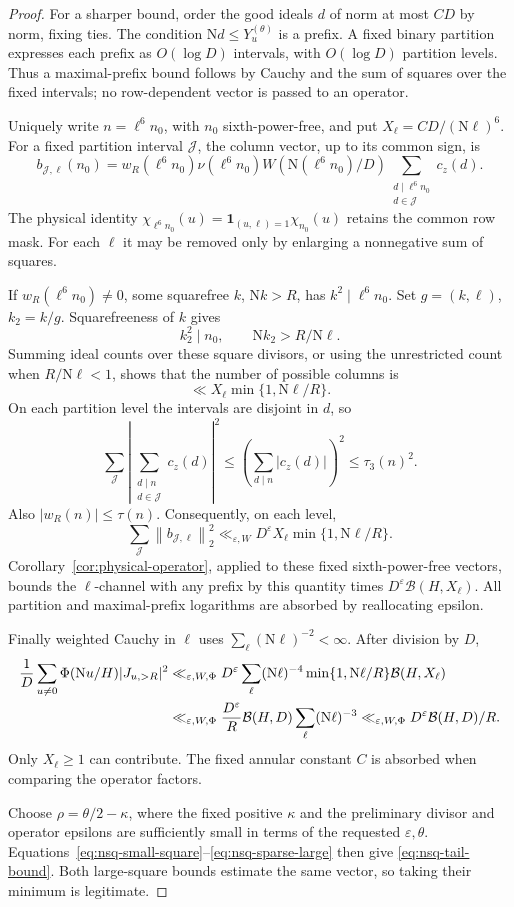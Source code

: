 \documentclass[11pt]{article}
\numberwithin{equation}{section}
\theoremstyle{definition}
\theoremstyle{remark}
\newcommand{\N}{\mathrm N}
\newcommand{\ind}{\mathbf 1}
\newcommand{\eps}{\varepsilon}
\newcommand{\norm}[1]{\left\lVert #1\right\rVert}
\begin{document}
\begin{proof}
For a sharper bound, order the good ideals \(d\) of norm at most \(CD\)
by norm, fixing ties. The condition \(\N d\le Y_u^{(\theta)}\) is a
prefix. A fixed binary partition expresses each prefix as
\(O(\log D)\) intervals, with \(O(\log D)\) partition levels.
Thus a maximal-prefix bound follows by Cauchy and the sum of squares
over the fixed intervals; no row-dependent vector is passed to an
operator.

Uniquely write \(n=\ell^6n_0\), with \(n_0\) sixth-power-free, and put
\(X_\ell=CD/(\N\ell)^6\). For a fixed partition interval \(\mathcal J\),
the column vector, up to its common sign, is
\[
 b_{\mathcal J,\ell}(n_0)=
 w_R(\ell^6n_0)\nu(\ell^6n_0)W(\N(\ell^6n_0)/D)
       \sum_{\substack{d\mid\ell^6n_0\\d\in\mathcal J}}c_z(d).
\]
The physical identity
\(\chi_{\ell^6n_0}(u)=\ind_{(u,\ell)=1}\chi_{n_0}(u)\)
retains the common row mask. For each \(\ell\) it may be removed only
by enlarging a nonnegative sum of squares.

If \(w_R(\ell^6n_0)\ne0\), some squarefree \(k\), \(\N k>R\),
has \(k^2\mid\ell^6n_0\). Set \(g=(k,\ell)\), \(k_2=k/g\).
Squarefreeness of \(k\) gives
\[
 k_2^2\mid n_0,\qquad \N k_2>R/\N\ell.
\]
Summing ideal counts over these square divisors, or using the
unrestricted count when \(R/\N\ell<1\), shows that the number of
possible columns is
\[
 \ll X_\ell\min\{1,\N\ell/R\}.
\]
On each partition level the intervals are disjoint in \(d\), so
\[
 \sum_{\mathcal J}
 \left|\sum_{\substack{d\mid n\\d\in\mathcal J}}c_z(d)\right|^2
 \le\left(\sum_{d\mid n}|c_z(d)|\right)^2\le\tau_3(n)^2.
\]
Also \(|w_R(n)|\le\tau(n)\). Consequently, on each level,
\[
 \sum_{\mathcal J}\norm{b_{\mathcal J,\ell}}_2^2
 \ll_{\eps,W}D^\eps X_\ell\min\{1,\N\ell/R\}.
\]
Corollary~\ref{cor:physical-operator}, applied to these fixed
sixth-power-free vectors, bounds the \(\ell\)-channel with any prefix
by this quantity times \(D^\eps\mathcal B(H,X_\ell)\).
All partition and maximal-prefix logarithms are absorbed by
reallocating epsilon.

Finally weighted Cauchy in \(\ell\) uses
\(\sum_\ell(\N\ell)^{-2}<\infty\). After division by \(D\),
\begin{align}
 \frac1D\sum_{u\ne0}\Phi(\N u/H)|J_{u,>R}|^2
 &\ll_{\eps,W,\Phi}D^\eps
   \sum_\ell(\N\ell)^{-4}\min\{1,\N\ell/R\}
                       \mathcal B(H,X_\ell)\notag\\
 &\ll_{\eps,W,\Phi}\frac{D^\eps}{R}\mathcal B(H,D)
                         \sum_\ell(\N\ell)^{-3}
 \ll_{\eps,W,\Phi}D^\eps\mathcal B(H,D)/R.
 \label{eq:nsq-sparse-large}
\end{align}
Only \(X_\ell\ge1\) can contribute. The fixed annular constant \(C\)
is absorbed when comparing the operator factors.

Choose \(\rho=\theta/2-\kappa\), where the fixed positive \(\kappa\)
and the preliminary divisor and operator epsilons are sufficiently
small in terms of the requested \(\eps,\theta\).
Equations~\eqref{eq:nsq-small-square}--\eqref{eq:nsq-sparse-large}
then give \eqref{eq:nsq-tail-bound}. Both large-square bounds estimate
the same vector, so taking their minimum is legitimate.
\end{proof}
\end{document}
